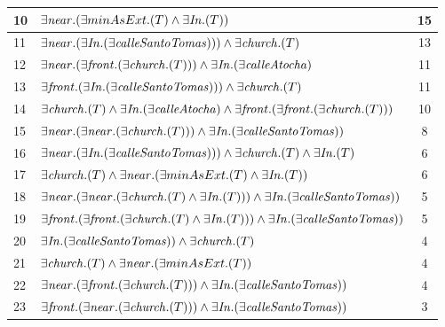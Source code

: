 \begin{table}[h]
\begin{center}
\begin{tabular}{|l|l|c|}
10&$\exists \mathit{near} .(\exists minAsExt .(T) \land \exists \mathit{In} .(T))$ &15\\ \hline

11&$\exists  \mathit{near}.(\exists \mathit{In} .(\exists \mathit{calleSantoTomas}))) \land \exists \mathit{church}.(T)$ &13\\ \hline

12&$\exists  \mathit{near}.(\exists \mathit{front}.(\exists \mathit{church}.(T))) \land \exists \mathit{In} .(\exists \mathit{calleAtocha})$ &11\\ \hline

13&$\exists \mathit{front}.(\exists \mathit{In} .(\exists \mathit{calleSantoTomas}))) \land \exists \mathit{church}.(T)$ &11\\ \hline

14&$\exists \mathit{church}.(T) \land \exists \mathit{In} .(\exists \mathit{calleAtocha}) \land \exists \mathit{front}.(\exists \mathit{front}.(\exists \mathit{church}.(T)))$ &10\\ \hline

15&$\exists  \mathit{near}.(\exists \mathit{near}.(\exists \mathit{church}.(T))) \land \exists \mathit{In} .(\exists \mathit{calleSantoTomas}))$ &8\\ \hline

16&$\exists  \mathit{near}.(\exists \mathit{In} .(\exists \mathit{calleSantoTomas}))) \land \exists \mathit{church}.(T) \land \exists \mathit{In} .(T)$ &6\\ \hline

17&$\exists \mathit{church}.(T) \land \exists \mathit{near} .(\exists minAsExt .(T) \land \exists \mathit{In} .(T))$ &6\\ \hline

18&$\exists  \mathit{near}.(\exists \mathit{near}.(\exists \mathit{church}.(T) \land \exists \mathit{In} .(T))) \land \exists \mathit{In} .(\exists \mathit{calleSantoTomas}))$ &5\\ \hline

19&$\exists \mathit{front}.(\exists \mathit{front}.(\exists \mathit{church}.(T) \land \exists \mathit{In} .(T))) \land \exists \mathit{In} .(\exists \mathit{calleSantoTomas}))$ &5\\ \hline

20&$\exists  \mathit{In} .(\exists \mathit{calleSantoTomas})) \land \exists \mathit{church}.(T)$ &4\\ \hline

21&$\exists \mathit{church}.(T) \land \exists \mathit{near} .(\exists minAsExt .(T))$ &4\\ \hline

22&$\exists  \mathit{near}.(\exists \mathit{front}.(\exists \mathit{church}.(T))) \land \exists \mathit{In} .(\exists \mathit{calleSantoTomas}))$ &4\\ \hline

23&$\exists \mathit{front}.(\exists \mathit{near}.(\exists \mathit{church}.(T))) \land \exists \mathit{In} .(\exists \mathit{calleSantoTomas}))$ &3\\ \hline


\end{tabular}
\end{center}
\end{table}
